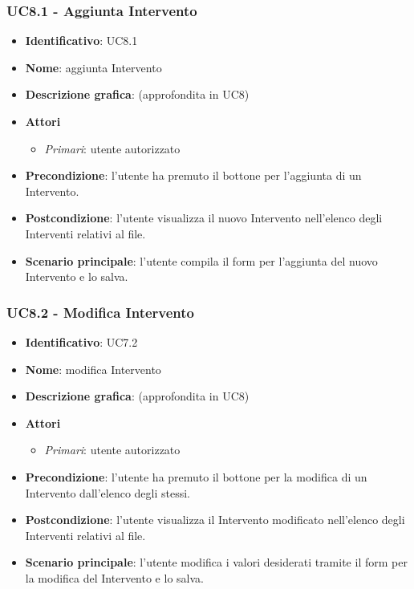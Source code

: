 \subsubsection{UC8.1 - Aggiunta Intervento}
\begin{itemize}
  \item \textbf{Identificativo}: UC8.1
  \item \textbf{Nome}: aggiunta Intervento
  \item \textbf{Descrizione grafica}: (approfondita in UC8)
  \item \textbf{Attori}
        \begin{itemize}
          \item \textit{Primari}: utente autorizzato
        \end{itemize}
  \item \textbf{Precondizione}: l'utente ha premuto il bottone per l'aggiunta di un Intervento.
  \item \textbf{Postcondizione}: l'utente visualizza il nuovo Intervento nell'elenco degli Interventi relativi al file.
  \item \textbf{Scenario principale}: l'utente compila il form per l'aggiunta del nuovo Intervento e lo salva.
\end{itemize}

\subsubsection{UC8.2 - Modifica Intervento}
\begin{itemize}
  \item \textbf{Identificativo}: UC7.2
  \item \textbf{Nome}: modifica Intervento
  \item \textbf{Descrizione grafica}: (approfondita in UC8)
  \item \textbf{Attori}
        \begin{itemize}
          \item \textit{Primari}: utente autorizzato
        \end{itemize}
  \item \textbf{Precondizione}: l'utente ha premuto il bottone per la modifica di un Intervento dall'elenco degli stessi.
  \item \textbf{Postcondizione}: l'utente visualizza il Intervento modificato nell'elenco degli Interventi relativi al file.
  \item \textbf{Scenario principale}: l'utente modifica i valori desiderati tramite il form per la modifica del Intervento e lo salva.
\end{itemize}

